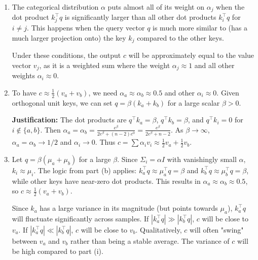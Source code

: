 
\begin{answer}
    \begin{enumerate}[label=(\alph*)]
        \item 
        \begin{subparts}
            \subpart The categorical distribution $\alpha$ puts almost all of its weight on $\alpha_j$ when the dot product $k_j^\top q$ is significantly larger than all other dot products $k_i^\top q$ for $i \neq j$. This happens when the query vector $q$ is much more similar to (has a much larger projection onto) the key $k_j$ compared to the other keys.
            
            \subpart Under these conditions, the output $c$ will be approximately equal to the value vector $v_j$, as it is a weighted sum where the weight $\alpha_j \approx 1$ and all other weights $\alpha_i \approx 0$.
        \end{subparts}

        \item To have $c \approx \frac{1}{2}(v_a + v_b)$, we need $\alpha_a \approx \alpha_b \approx 0.5$ and other $\alpha_i \approx 0$. Given orthogonal unit keys, we can set $q = \beta(k_a + k_b)$ for a large scalar $\beta > 0$. 
        
        \textbf{Justification:} The dot products are $q^\top k_a = \beta$, $q^\top k_b = \beta$, and $q^\top k_i = 0$ for $i \notin \{a, b\}$. Then $\alpha_a = \alpha_b = \frac{e^\beta}{2e^\beta + (n-2)e^0} = \frac{e^\beta}{2e^\beta + n - 2}$. As $\beta \to \infty$, $\alpha_a = \alpha_b \to 1/2$ and $\alpha_i \to 0$. Thus $c = \sum \alpha_i v_i \approx \frac{1}{2}v_a + \frac{1}{2}v_b$.

        \item 
        \begin{subparts}
            \subpart Let $q = \beta(\mu_a + \mu_b)$ for a large $\beta$. Since $\Sigma_i = \alpha I$ with vanishingly small $\alpha$, $k_i \approx \mu_i$. The logic from part (b) applies: $k_a^\top q \approx \mu_a^\top q = \beta$ and $k_b^\top q \approx \mu_b^\top q = \beta$, while other keys have near-zero dot products. This results in $\alpha_a \approx \alpha_b \approx 0.5$, so $c \approx \frac{1}{2}(v_a + v_b)$.
            
            \subpart Since $k_a$ has a large variance in its magnitude (but points towards $\mu_a$), $k_a^\top q$ will fluctuate significantly across samples. If $|k_a^\top q| \gg |k_b^\top q|$, $c$ will be close to $v_a$. If $|k_a^\top q| \ll |k_b^\top q|$, $c$ will be close to $v_b$. Qualitatively, $c$ will often "swing" between $v_a$ and $v_b$ rather than being a stable average. The variance of $c$ will be high compared to part (i).
        \end{subparts}


\end{enumerate}
\end{answer}
